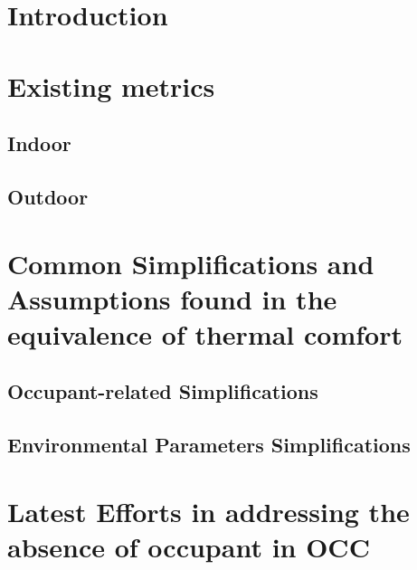 \documentclass[review]{elsarticle}
\begin{document}
\section{Introduction}


\section{Existing metrics}
    \subsection{Indoor}
    
    \subsection{Outdoor}
    

\section{Common Simplifications and Assumptions found in the equivalence of thermal comfort}
    \subsection{Occupant-related Simplifications}
    
    \subsection{Environmental Parameters Simplifications}
    
%         
%         
\section{Latest Efforts in addressing the absence of occupant in OCC}
\end{document}
